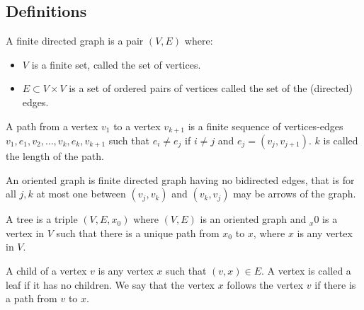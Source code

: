 \subsection{Definitions}
\begin{definition}
    A finite directed graph is a pair $(V,E)$ where:
    \begin{itemize}
        \item $V$ is a finite set, called the set of vertices. 
        \item $E \subset V \times V$ is a set of ordered pairs of vertices called the set of the (directed) edges.
    \end{itemize}
\end{definition}
\begin{definition}
    A path from a vertex $v_1$ to a vertex $v_{k+1}$ is a finite sequence of vertices-edges $v_1,e_1,v_2,\dots,v_k,e_k,v_{k+1}$ such that $e_i \neq e_j$ if $i \neq j$ and $e_j = (v_j,v_{j+1})$. 
    $k$ is called the length of the path. 
\end{definition}
\begin{definition}
    An oriented graph is finite directed graph having no bidirected edges, that is for all $j,k$ at most one between $(v_j,v_k)$ and $(v_k,v_j)$ may be arrows of the graph.
\end{definition}
\begin{definition}
    A tree is a triple $(V,E,x_0)$ where $(V,E)$ is an oriented graph and $_x0$ is a vertex in $V$ such that there is a unique path from $x_0$ to $x$, where $x$ is any vertex in $V$. 
\end{definition}
\begin{definition}
    A child of a vertex $v$ is any vertex $x$ such that $(v,x) \in E$. 
    A vertex is called a leaf if it has no children. 
    We say that the vertex $x$ follows the vertex $v$ if there is a path from $v$ to $x$.
\end{definition}


